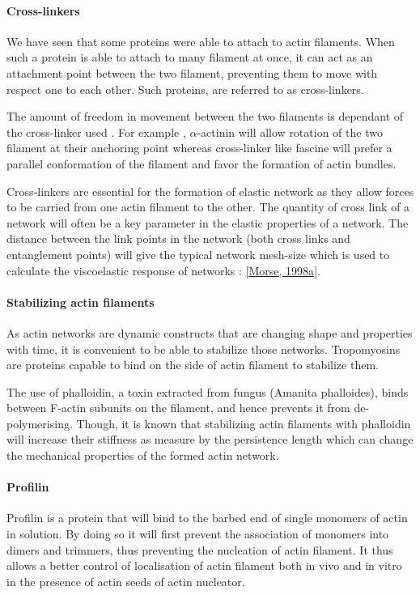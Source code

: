 \documentclass[A4paperpaper,11pt,english]{sphinxmanual}
\begin{document}
\paragraph{Cross-linkers}
\label{parts/part1:cross-linkers}
We have seen that some proteins were able to attach to actin filaments. When
such a protein is able to attach to many filament at once, it can act as an
attachment point between the two filament, preventing them to move with respect
one to each other. Such proteins, are referred to as cross-linkers.

The amount of freedom in movement between the two filaments is dependant of the
cross-linker used . For example , \(\alpha\)-actinin will allow rotation of the two
filament at their anchoring point whereas cross-linker like fascine will prefer
a parallel conformation of the filament and favor the formation of actin
bundles.

Cross-linkers are essential for the formation of elastic network as they allow
forces to be carried from one actin filament to the other. The quantity of
cross link of a network will often be a key parameter in the elastic properties
of a network. The distance between the link points in the network (both cross links
and entanglement points) will give the typical network mesh-size which is used
to calculate the viscoelastic response of networks : {\hyperref[parts/part1:morse1998a]{{[}Morse,  1998a{]}}}.


\paragraph{Stabilizing actin filaments}
\label{parts/part1:stabilizing-actin-filaments}
As actin networks are dynamic constructs that are changing shape and properties
with time, it is convenient to be able to stabilize those networks. Tropomyosins
are proteins capable to bind on the side of actin filament to stabilize them.

The use of phalloidin, a toxin extracted from fungus (Amanita phalloides), binds
between F-actin subunits on the filament, and hence  prevents it from
de-polymerising.  Though, it is known that stabilizing actin filaments with
phalloidin will increase their stiffness as measure by the persistence length which can change the
mechanical properties of the formed actin network.


\paragraph{Profilin}
\label{parts/part1:profilin}
Profilin is a protein that will bind to the barbed end of single monomers of
actin in solution.  By doing so it will first prevent the association of
monomers into dimers and trimmers, thus preventing the nucleation of actin
filament. It thus allows a better control of localisation of actin filament
both in vivo and in vitro in the presence of actin seeds of actin nucleator.
\end{document}
